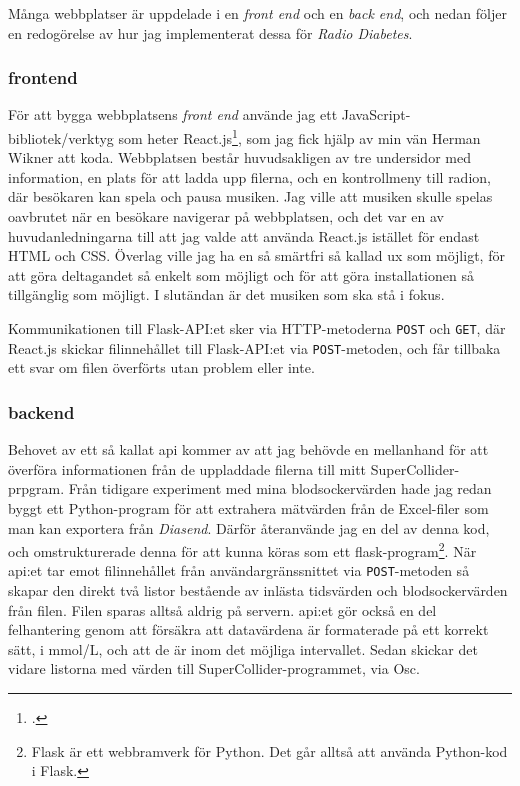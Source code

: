 \documentclass[11pt, a4paper]{article} %
\begin{document}
Många webbplatser är uppdelade i en \emph{front end} och en \emph{back end}, och nedan följer en redogörelse av hur jag implementerat dessa för \emph{Radio Diabetes}. 

\subsubsection*{\gls{frontend}}
För att bygga webbplatsens \emph{front end} använde jag ett JavaScript-bibliotek/verktyg som heter React.js\footcite{noauthor_react_nodate}, som jag fick hjälp av min vän Herman Wikner att koda. Webbplatsen består huvudsakligen av tre undersidor med information, en plats för att ladda upp filerna, och en kontrollmeny till radion, där besökaren kan spela och pausa musiken. Jag ville att musiken skulle spelas oavbrutet när en besökare navigerar på webbplatsen, och det var en av huvudanledningarna till att jag valde att använda React.js istället för endast HTML och CSS. Överlag ville jag ha en så smärtfri så kallad \gls{ux} som möjligt, för att göra deltagandet så enkelt som möjligt och för att göra installationen så tillgänglig som möjligt. I slutändan är det musiken som ska stå i fokus.

Kommunikationen till Flask-API:et sker via HTTP-metoderna \texttt{POST} och \texttt{GET}, där React.js skickar filinnehållet till Flask-API:et via \texttt{POST}-metoden, och får tillbaka ett svar om filen överförts utan problem eller inte.



\subsubsection*{\gls{backend}}
Behovet av ett så kallat \gls{api} kommer av att jag behövde en mellanhand för att överföra informationen från de uppladdade filerna till mitt SuperCollider-prpgram. Från tidigare experiment med mina blodsockervärden hade jag redan byggt ett Python-program för att extrahera mätvärden från de Excel-filer som man kan exportera från \emph{Diasend}. Därför återanvände jag en del av denna kod, och omstrukturerade denna för att kunna köras som ett \gls{flask}-program\footnote{Flask är ett webbramverk för Python. Det går alltså att använda Python-kod i Flask.}. När \gls{api}:et tar emot filinnehållet från användargränssnittet via \texttt{POST}-metoden så skapar den direkt två listor bestående av inlästa tidsvärden och blodsockervärden från filen. Filen sparas alltså aldrig på servern. \gls{api}:et gör också en del felhantering genom att försäkra att datavärdena är formaterade på ett korrekt sätt, i mmol/L, och att de är inom det möjliga intervallet. Sedan skickar det vidare listorna med värden till SuperCollider-programmet, via Osc. 
\end{document}
